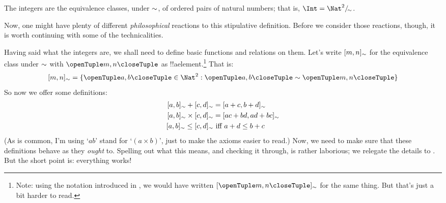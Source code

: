 \documentclass[../../../include/open-logic-section]{subfiles}
\begin{document}
\begin{defn}
		The integers are the equivalence classes, under $\sim$, of  ordered pairs of natural numbers; that is, $\Int = \equivclass{\Nat^2}{\Intequiv}$.
\end{defn}

Now, one might have plenty of different \emph{philosophical} reactions to this stipulative definition. Before we consider those reactions, though, it is worth continuing with some of the technicalities. 

Having said what the integers are, we shall need to define basic functions and relations on them. Let's write $[m, n]_{\sim}$ for the equivalence class under $\sim$ with $\tuple{m, n}$ as !!a{element}.\footnote{Note: using the notation introduced in , we would have written $\equivrep{\tuple{m,n}}{\Intequiv}$ for the same thing. But that's just a bit harder to read.} That is: 
	$$\equivrep{m, n}{\Intequiv} = \Setabs{\tuple{a, b} \in \Nat^2}{\tuple{a, b}\Intequiv \tuple{m, n}}$$
So now we offer some definitions:
	\begin{align*}
		\equivrep{a, b}{\Intequiv} + \equivrep{c, d}{\Intequiv} &= \equivrep{a + c, b + d}{\Intequiv}\\
		\equivrep{a, b}{\Intequiv} \times \equivrep{c, d}{\Intequiv} &= \equivrep{a c + b  d, a  d + b c}{\Intequiv}\\
		\equivrep{a, b}{\Intequiv} \leq \equivrep{c, d}{\Intequiv} &\text{ iff }a + d \leq b + c
	\end{align*}	
(As is common, I'm using `$ab$' stand for `$(a \times b)$', just to make the axioms easier to read.) Now, we need to make sure that these definitions behave as they \emph{ought} to. Spelling out what this means, and checking it through, is rather laborious; we relegate the details to . But the short point is: everything works! 
\end{document}
